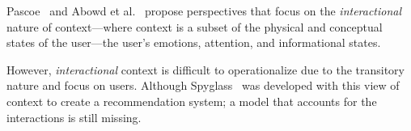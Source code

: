 Pascoe~\citep{Pascoe:1998} and Abowd et al.~\cite{Abowd:1999} propose perspectives that focus on the \textit{interactional} nature of context---where context is a subset of the physical and conceptual states of the user---the user's emotions, attention, and informational states.


However, \textit{interactional} context is difficult to operationalize due to the transitory nature and focus on users. Although Spyglass~\cite{Viriyakattiyaporn:2010} was developed with this view of context to create a recommendation system; a model that accounts for the interactions is still missing.


